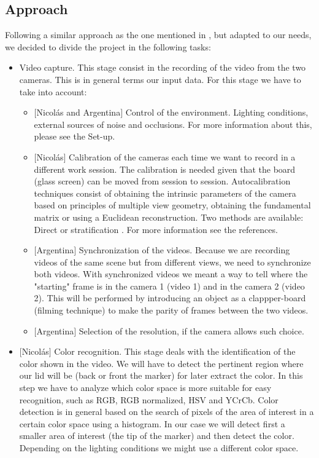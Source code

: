 \documentclass[a4paper,12pt]{article}
\begin{document}

\subsection*{Approach}
Following a similar approach as the one mentioned in \cite{conci}, but adapted to our needs, we decided to divide the project in the following tasks:
\begin{itemize}
    \item Video capture. This stage consist in the recording of the video from the two cameras. This is in general terms our input data. For this stage we have to take into account:
    \begin{itemize}
        \item $[$Nicolás and Argentina$]$ Control of the environment. Lighting conditions, external sources of noise and occlusions. For more information about this, please see the Set-up.
        \item $[$Nicolás$]$ Calibration of the cameras each time we want to record in a different work session. The calibration is needed given that the board (glass screen) can be moved from session to session. Autocalibration techniques consist of obtaining the intrinsic parameters of the camera based on principles of multiple view geometry, obtaining the fundamental matrix or using a Euclidean reconstruction. Two methods are available: Direct \cite{mendoncca} or stratification \cite{faugeras}. For more information see the references.
        \item $[$Argentina$]$ Synchronization of the videos. Because we are recording videos of the same scene but from different views, we need to synchronize both videos. With synchronized videos we meant a way to tell where the "starting" frame is in the camera 1 (video 1) and in the camera 2 (video 2). This will be performed by introducing an object as a clappper-board (filming technique) to make the parity of frames between the two videos.
        \item $[$Argentina$]$ Selection of the resolution, if the camera allows such choice.
    \end{itemize}
    \item $[$Nicolás$]$ Color recognition. This stage deals with the identification of the color shown in the video. We will have to detect the pertinent region where our lid will be (back or front the marker) for later extract the color. In this step we have to analyze which color space is more suitable for easy recognition, such as RGB, RGB normalized, HSV and YCrCb. Color detection is in general based on the search of pixels of the area of interest in a certain color space using a histogram. In our case we will detect first a smaller area of interest (the tip of the marker) and then detect the color. Depending on the lighting conditions we might use a different color space.

\end{itemize}
\end{document}
